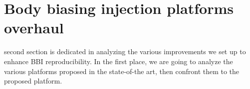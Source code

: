 
\section{Body biasing injection platforms overhaul}
 second section is dedicated in analyzing the various improvements we set up to enhance BBI reproducibility.
In the first place, we are going to analyze the various platforms proposed in the state-of-the art, then confront them to the proposed platform.